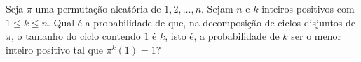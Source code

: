 Seja $\pi$ uma permutação aleatória de $1, 2, \dots, n$.
Sejam $n$ e $k$ inteiros positivos com $1 \le k \le n$.
Qual é a probabilidade de que, na decomposição de ciclos disjuntos de $\pi$, o tamanho do ciclo contendo $1$ é $k$, isto é, a probabilidade de $k$ ser o menor inteiro positivo tal que $\pi^k(1) = 1$?

